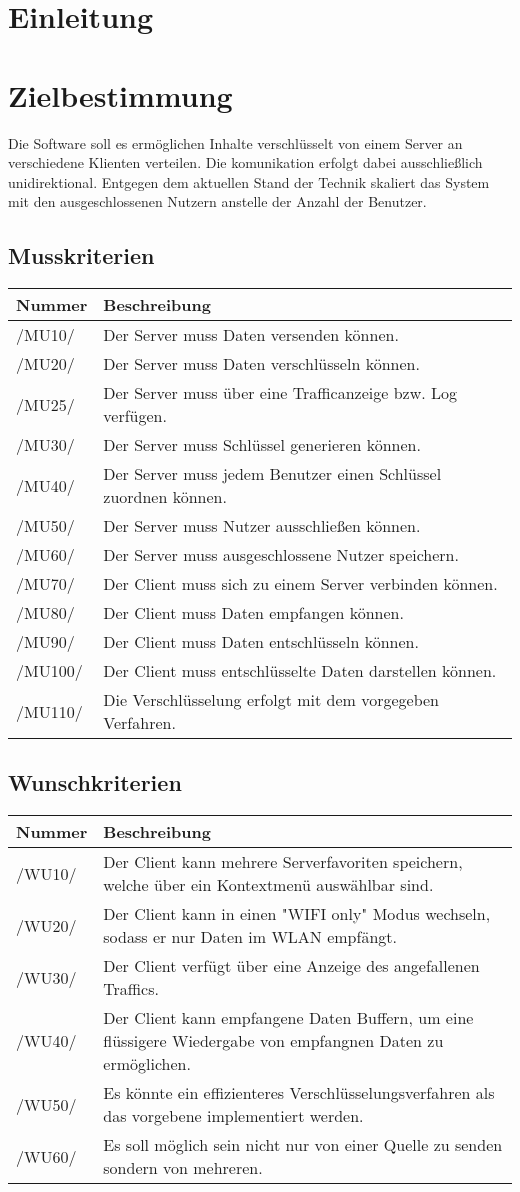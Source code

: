 \documentclass[a4paper,10pt]{article}
\title{\doctitle}
\author{\authorName}
\date{\today}
\newcommand\addrow[2]{#1 &#2\\ }
\newcommand\addheading[2]{#1 &#2\\ \hline}
\newcommand\tabularhead{\begin{tabular}{lp{13cm}}
\hline
}
\newenvironment{usecase}{\tabularhead}
{\hline\end{tabular}}
\begin{document}

\tableofcontents

\clearpage
\section{Einleitung}
\section{Zielbestimmung}
Die Software soll es ermöglichen Inhalte verschlüsselt von einem Server an verschiedene Klienten verteilen. Die komunikation erfolgt dabei ausschließlich unidirektional. 
Entgegen dem aktuellen Stand der Technik skaliert das System mit den ausgeschlossenen Nutzern anstelle der Anzahl der Benutzer.

\subsection{Musskriterien}
\newcommand{\mussKuerzel}{MU}
\begin{usecase}
\addheading{Nummer}{Beschreibung}
\addrow{/\mussKuerzel10/} {Der Server muss Daten versenden können.}
\addrow{/\mussKuerzel20/} {Der Server muss Daten verschlüsseln können.}
\addrow{/\mussKuerzel25/} {Der Server muss über eine Trafficanzeige bzw. Log verfügen.}
\addrow{/\mussKuerzel30/} {Der Server muss Schlüssel generieren können.}
\addrow{/\mussKuerzel40/} {Der Server muss jedem Benutzer einen Schlüssel zuordnen können.}
\addrow{/\mussKuerzel50/} {Der Server muss Nutzer ausschließen können.}
\addrow{/\mussKuerzel60/} {Der Server muss ausgeschlossene Nutzer speichern.}
\addrow{/\mussKuerzel70/} {Der Client muss sich zu einem Server verbinden können.}
\addrow{/\mussKuerzel80/} {Der Client muss Daten empfangen können.}
\addrow{/\mussKuerzel90/} {Der Client muss Daten entschlüsseln können.}
\addrow{/\mussKuerzel100/} {Der Client muss entschlüsselte Daten darstellen können.}
\addrow{/\mussKuerzel110/} {Die Verschlüsselung erfolgt mit dem vorgegeben Verfahren.}
\end{usecase}

\subsection{Wunschkriterien}
\newcommand{\wunschKuerzel}{WU}
\begin{usecase}
\addheading{Nummer}{Beschreibung}
\addrow{/\wunschKuerzel10/} {Der Client kann mehrere Serverfavoriten speichern, welche über ein Kontextmenü auswählbar sind.}
\addrow{/\wunschKuerzel20/} {Der Client kann in einen "WIFI only" Modus wechseln, sodass er nur Daten im WLAN empfängt.}
\addrow{/\wunschKuerzel30/} {Der Client verfügt über eine Anzeige des angefallenen Traffics.}
\addrow{/\wunschKuerzel40/} {Der Client kann empfangene Daten Buffern, um eine flüssigere Wiedergabe von empfangnen Daten zu ermöglichen.}
\addrow{/\wunschKuerzel50/} {Es könnte ein effizienteres Verschlüsselungsverfahren als das vorgebene implementiert werden.}
\addrow{/\wunschKuerzel60/} {Es soll möglich sein nicht nur von einer Quelle zu senden sondern von mehreren.}
\end{usecase}
\end{document}
